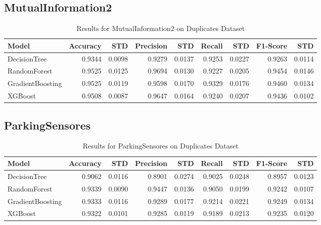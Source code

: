 \documentclass{article}
\begin{document}
\subsection{MutualInformation2}
\begin{table}[h!]
\centering
\caption{Results for MutualInformation2 on Duplicates Dataset}
\begin{tabular}{l|rr|rr|rr|rr}
\hline
Model & Accuracy & STD & Precision & STD & Recall & STD & F1-Score & STD \\
\hline
DecisionTree & 0.9344 & 0.0098 & 0.9279 & 0.0137 & 0.9253 & 0.0227 & 0.9263 & 0.0114 \\
RandomForest & 0.9525 & 0.0125 & 0.9694 & 0.0130 & 0.9227 & 0.0205 & 0.9454 & 0.0146 \\
GradientBoosting & 0.9525 & 0.0119 & 0.9598 & 0.0170 & 0.9329 & 0.0176 & 0.9460 & 0.0134 \\
XGBoost & 0.9508 & 0.0087 & 0.9647 & 0.0164 & 0.9240 & 0.0207 & 0.9436 & 0.0102 \\
\hline
\end{tabular}
\end{table}

\subsection{ParkingSensores}
\begin{table}[h!]
\centering
\caption{Results for ParkingSensores on Duplicates Dataset}
\begin{tabular}{l|rr|rr|rr|rr}
\hline
Model & Accuracy & STD & Precision & STD & Recall & STD & F1-Score & STD \\
\hline
DecisionTree & 0.9062 & 0.0116 & 0.8901 & 0.0274 & 0.9025 & 0.0248 & 0.8957 & 0.0123 \\
RandomForest & 0.9339 & 0.0090 & 0.9447 & 0.0136 & 0.9050 & 0.0199 & 0.9242 & 0.0107 \\
GradientBoosting & 0.9333 & 0.0116 & 0.9289 & 0.0177 & 0.9214 & 0.0221 & 0.9249 & 0.0134 \\
XGBoost & 0.9322 & 0.0101 & 0.9285 & 0.0119 & 0.9189 & 0.0213 & 0.9235 & 0.0120 \\
\hline
\end{tabular}
\end{table}
\end{document}
